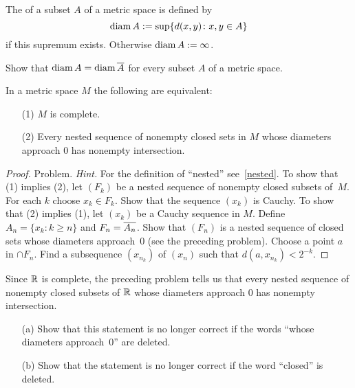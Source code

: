 \begin{defn} The
 of a subset $A$ of a metric space is defined by
   \[ \operatorname{diam} A := \sup\{d(x,y) \colon x,y \in A\} \]
if this supremum exists.  Otherwise $\operatorname{diam} A := \infty$.
\end{defn}

\begin{prob}  Show that $\operatorname{diam} A = \operatorname{diam} \overline{A}$ for every subset $A$ of a metric space.
\end{prob}

\begin{prop} In a metric space $M$ the following are equivalent:
 \begin{enumerate}
  \item[(1)] $M$ is complete.
  \item[(2)] Every nested sequence of nonempty closed sets in $M$ whose diameters approach
$0$ has nonempty intersection.
 \end{enumerate}
\end{prop}

\begin{proof} Problem. \emph{Hint.} For the definition of ``nested'' see~\ref{nested}.
To show that (1) implies (2), let $(F_k)$ be a nested sequence of nonempty closed subsets
of~$M$. For each $k$ choose $x_k \in F_k$.  Show that the sequence $(x_k)$ is Cauchy.  To show
that (2) implies (1), let $(x_k)$ be a Cauchy sequence in $M$.  Define $A_n = \{x_k \colon k
\ge n\}$ and $F_n = \overline{A_n}$.  Show that $(F_n)$ is a nested sequence of closed sets whose
diameters approach~$0$ (see the preceding problem).  Choose a point $a$ in $\cap F_n$.  Find a
subsequence $\left(x_{n_k}\right)$ of $(x_n)$ such that $d\left(a,x_{n_k}\right) < 2^{-k}$.
\ns
\end{proof}

\begin{prob} Since $\mathbb{R}$ is complete, the preceding problem tells us that every nested sequence
of nonempty closed subsets of $\mathbb{R}$ whose diameters approach $0$ has nonempty intersection.
 \begin{enumerate}
  \item[(a)] Show that this statement is no longer correct if the words ``whose diameters
approach~$0$'' are deleted.
  \item[(b)] Show that the statement is no longer correct if the word ``closed'' is deleted.
 \end{enumerate}
\end{prob}

